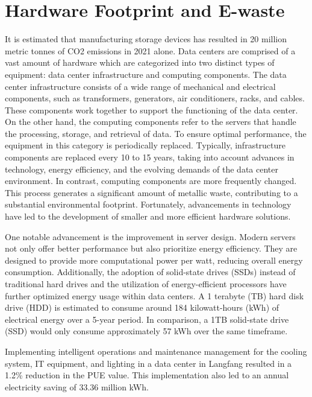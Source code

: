 \documentclass[
  a4paper,  %
  twoside,  %
  bibliography=totoc,
  headsepline,
  cleardoublepage=empty,
  parskip=half,
  draft=false
]{scrbook}
\begin{document}
\chapter{Hardware Footprint and E-waste}
It is estimated that manufacturing storage devices has resulted in 20 million metric tonnes of CO2 emissions in 2021 alone\cite{networkworldHDDsGreener}.
Data centers are comprised of a vast amount of hardware which are categorized into two distinct types of equipment: data center infrastructure and computing components. The data center infrastructure consists of a wide range of mechanical and electrical components, such as transformers, generators, air conditioners, racks, and cables. These components work together to support the functioning of the data center. On the other hand, the computing components refer to the servers that handle the processing, storage, and retrieval of data. To ensure optimal performance, the equipment in this category is periodically replaced. Typically, infrastructure components are replaced every 10 to 15 years, taking into account advances in technology, energy efficiency, and the evolving demands of the data center environment\cite{samaye2024energy}. In contrast, computing components are more frequently changed. This process generates a significant amount of metallic waste, contributing to a substantial environmental footprint. Fortunately, advancements in technology have led to the development of smaller and more efficient hardware solutions.  

One notable advancement is the improvement in server design\cite{hoorn2016improving}. Modern servers not only offer better performance but also prioritize energy efficiency. They are designed to provide more computational power per watt, reducing overall energy consumption. Additionally, the adoption of solid-state drives (SSDs) instead of traditional hard drives and the utilization of energy-efficient processors have further optimized energy usage within data centers. A 1 terabyte (TB) hard disk drive (HDD) is estimated to consume around 184 kilowatt-hours (kWh) of electrical energy over a 5-year period. In comparison, a 1TB solid-state drive (SSD) would only consume approximately 57 kWh over the same timeframe\cite{networkworldHDDsGreener}. 

Implementing intelligent operations and maintenance management for the cooling system, IT equipment, and lighting in a data center in Langfang resulted in a 1.2\% reduction in the PUE value. This implementation also led to an annual electricity saving of 33.36 million kWh\cite{li2023china}.
\end{document}
